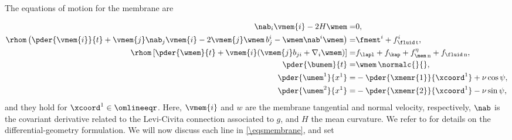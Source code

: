 The equations of motion for the membrane  are \cite{worthmullerIRENEFluIdLayeR2025,al-izziShearDrivenInstabilitiesMembrane2020,arroyoRelaxationDynamicsFluid2009i}

\bw
\begin{align}
    \label{eq-dyn-continuity}
    \nab_i \vmem{i} - 2 H \wmem                                                                              =               & 0,                                                                                                                                                                      \\
    \label{eq-dyn-v}
    \rhom \left( \pder{\vmem{i}}{t}+ \vmem{j} \nab_j \vmem{i}  - 2 \vmem{j} \wmem\, b^i_j - \wmem \nab^i \wmem \right)     = & \fmemt^i + f_{\fluid\, \text{t}}^i,                                                                                                                                     \\
    \label{eq-dyn-w}
    \rhom \left[ \pder{\wmem}{t} + \vmem{i} ( \vmem{j} b_{ji} + \nabla_i \wmem  ) \right]                               =    & f_\lapl   +  f_\kap +                                                         \fetamemn+ \fflun                                                                       , \\
    \label{eq-dyn-dX}
    \pder {\bumem}{t}                                                                                            =           & \wmem \, \normalc{}{},                                                                                                                                                  \\
    \label{eq-dyn-dX1}
    \pder {\umem^1}{x^1}                                                                                            =        & - \pder{\xmemr{1}}{\xcoord^1} + \nu \cos \psi,                                                                                                                          \\
    \label{eq-dyn-dX2}
    \pder {\umem^2}{x^1}                                                                                               =     & - \pder{\xmemr{2}}{\xcoord^1} -\nu \sin \psi,
\end{align}
\ew
and they hold for $\xcoord^1 \in \omlineeqr$.
%
Here, $\vmem{i}$ and $w$ are the membrane tangential and normal velocity, respectively, $\nab$ is the covariant derivative related to the Levi-Civita connection associated to $g$, and $H$ the mean  curvature.
We refer to \cite{desernoFluidLipidMembranes2015,worthmullerIRENEFluIdLayeR2025,marchiafavaAppuntiDiGeometria2005,arroyoRelaxationDynamicsFluid2009i} for details on the differential-geometry formulation.
We will now discuss each line in \cref{\eqsmembrane}, and  set

